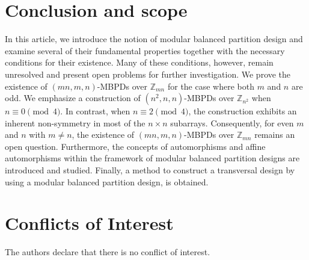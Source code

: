\documentclass[preprint,11pt]{elsarticle}
\begin{document}
\section{Conclusion and scope}
In this article, we introduce the notion of {modular balanced partition design} and examine several of their fundamental properties together with the necessary conditions for their existence. Many of these conditions, however, remain unresolved and present open problems for further investigation. 
We prove the existence of $(mn, m, n)$-MBPDs over $\mathbb{Z}_{mn}$ for the case where both $m$ and $n$ are odd. We emphasize a construction of $(n^{2}, n, n)$-MBPDs over $\mathbb{Z}_{n^{2}}$ when $n \equiv 0 \pmod{4}$. In contrast, when $n \equiv 2 \pmod{4}$, the construction exhibits an inherent non-symmetry in most of the $n \times n$ subarrays. Consequently, for even $m$ and $n$ with $m \neq n$, the existence of $(mn, m, n)$-MBPDs over $\mathbb{Z}_{mn}$ remains an open question. Furthermore, the concepts of automorphisms and affine automorphisms within the framework of modular balanced partition designs are introduced and studied. Finally, a method to  construct a transversal design by using a modular balanced partition design, is obtained.


\section*{Conflicts of Interest}
The authors declare that there is no conflict of interest.
\end{document}
